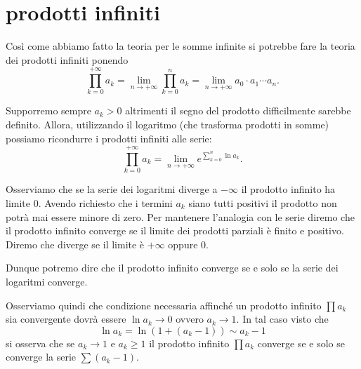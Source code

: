 \section{prodotti infiniti}

Così come abbiamo fatto la teoria per le somme infinite si potrebbe fare
la teoria dei prodotti infiniti ponendo
\[
  \prod_{k=0}^{+\infty} a_k = \lim_{n\to +\infty} \prod_{k=0}^n a_k
  = \lim_{n\to +\infty} a_0 \cdot a_1 \cdots a_n.
\]

Supporremo sempre $a_k>0$ altrimenti il segno del prodotto difficilmente
sarebbe definito.
Allora, utilizzando il logaritmo (che trasforma prodotti in somme) possiamo
ricondurre i prodotti infiniti
alle serie:
\[
  \prod_{k=0}^{+\infty} a_k = \lim_{n\to +\infty} e^{\sum_{k=0}^n \ln a_k}.
\]

Osserviamo che se la serie dei logaritmi diverge a $-\infty$ il prodotto infinito
ha limite $0$. Avendo richiesto che i termini $a_k$ siano tutti positivi il prodotto
non potrà mai essere minore di zero. Per mantenere l'analogia con le serie diremo
che il prodotto infinito converge se il limite dei prodotti parziali è finito e positivo.
Diremo che diverge se il limite è $+\infty$ oppure $0$.

Dunque potremo dire che il prodotto infinito converge se e solo se la serie dei logaritmi converge.

Osserviamo quindi che condizione necessaria affinché un prodotto infinito
$\prod a_k$ sia convergente
dovrà essere $\ln a_k\to 0$ ovvero $a_k \to 1$. In tal caso visto che
\[
  \ln a_k = \ln (1+(a_k-1)) \sim a_k - 1
\]
si osserva che se $a_k\to 1$ e $a_k\ge 1$ il prodotto infinito $\prod a_k$ converge
se e solo se converge la serie $\sum (a_k-1)$.

